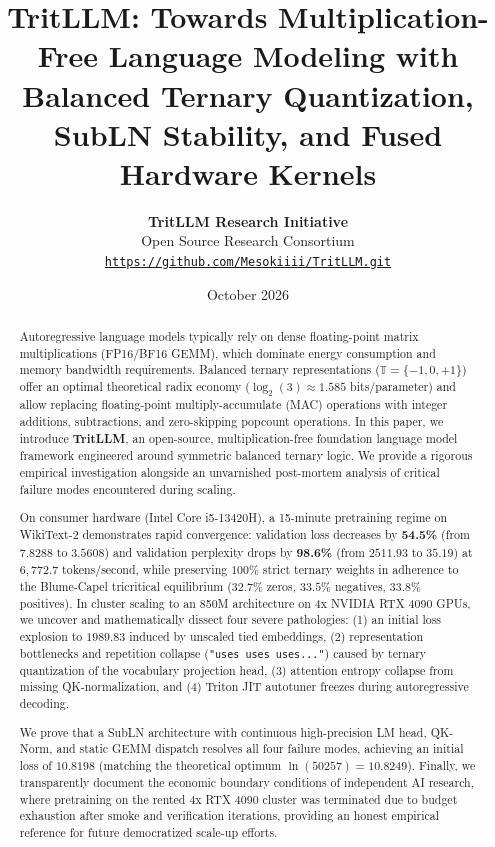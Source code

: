 \documentclass[11pt,a4paper]{article}
\title{\textbf{\Large TritLLM: Towards Multiplication-Free Language Modeling with Balanced Ternary Quantization, SubLN Stability, and Fused Hardware Kernels}}
\author{
    \textbf{TritLLM Research Initiative} \\
    Open Source Research Consortium \\
    \texttt{\url{https://github.com/Mesokiiii/TritLLM.git}}
}
\date{October 2026}
\begin{document}
\maketitle

\begin{abstract}
Autoregressive language models typically rely on dense floating-point matrix multiplications (FP16/BF16 GEMM), which dominate energy consumption and memory bandwidth requirements. Balanced ternary representations ($\mathbb{T} = \{-1, 0, +1\}$) offer an optimal theoretical radix economy ($\log_2(3) \approx 1.585$ bits/parameter) and allow replacing floating-point multiply-accumulate (MAC) operations with integer additions, subtractions, and zero-skipping popcount operations. In this paper, we introduce \textbf{TritLLM}, an open-source, multiplication-free foundation language model framework engineered around symmetric balanced ternary logic. We provide a rigorous empirical investigation alongside an unvarnished post-mortem analysis of critical failure modes encountered during scaling. 

On consumer hardware (Intel Core i5-13420H), a 15-minute pretraining regime on WikiText-2 demonstrates rapid convergence: validation loss decreases by \textbf{54.5\%} (from $7.8288$ to $3.5608$) and validation perplexity drops by \textbf{98.6\%} (from $2511.93$ to $35.19$) at $6,772.7$ tokens/second, while preserving $100\%$ strict ternary weights in adherence to the Blume-Capel tricritical equilibrium ($32.7\%$ zeros, $33.5\%$ negatives, $33.8\%$ positives). In cluster scaling to an 850M architecture on 4x NVIDIA RTX 4090 GPUs, we uncover and mathematically dissect four severe pathologies: (1) an initial loss explosion to $1989.83$ induced by unscaled tied embeddings, (2) representation bottlenecks and repetition collapse (\texttt{"uses uses uses..."}) caused by ternary quantization of the vocabulary projection head, (3) attention entropy collapse from missing QK-normalization, and (4) Triton JIT autotuner freezes during autoregressive decoding. 

We prove that a SubLN architecture with continuous high-precision LM head, QK-Norm, and static GEMM dispatch resolves all four failure modes, achieving an initial loss of $10.8198$ (matching the theoretical optimum $\ln(50257) = 10.8249$). Finally, we transparently document the economic boundary conditions of independent AI research, where pretraining on the rented 4x RTX 4090 cluster was terminated due to budget exhaustion after smoke and verification iterations, providing an honest empirical reference for future democratized scale-up efforts.
\end{abstract}
\end{document}
